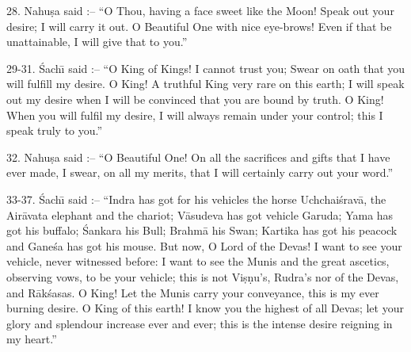 28. Nahu\d{s}a said :-- ``O Thou, having a face sweet like the Moon! Speak out your desire; I will carry it out. O Beautiful One with nice eye-brows! Even if that be unattainable, I will give that to you.''

29-31. \'Sach\={\i} said :-- ``O King of Kings! I cannot trust you; Swear on oath that you will fulfill my desire. O King! A truthful King very rare on this earth; I will speak out my desire when I will be convinced that you are bound by truth. O King! When you will fulfil my desire, I will always remain under your control; this I speak truly to you.''

32. Nahu\d{s}a said :-- ``O Beautiful One! On all the sacrifices and gifts that I have ever made, I swear, on all my merits, that I will certainly carry out your word.''

33-37. \'Sach\={\i} said :-- ``Indra has got for his vehicles the horse Uchchai\'srav\=a, the Air\=avata elephant and the chariot; V\=asudeva has got vehicle Garuda; Yama has got his buffalo; \'Sankara his Bull; Brahm\=a his Swan; Kartika has got his peacock and Gane\'sa has got his mouse. But now, O Lord of the Devas! I want to see your vehicle, never witnessed before: I want to see the Munis and the great ascetics, observing vows, to be your vehicle; this is not Vi\d{s}\d{n}u's, Rudra's nor of the Devas, and R\=ak\'sasas. O King! Let the Munis carry your conveyance, this is my ever burning desire. O King of this earth! I know you the highest of all Devas; let your glory and splendour increase ever and ever; this is the intense desire reigning in my heart.''

